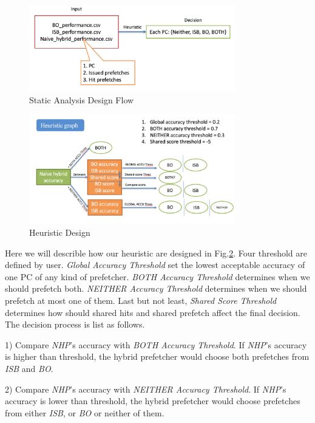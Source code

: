   \begin{figure}[ht!]
	  \centering
	  \includegraphics[width=0.8\textwidth]{images/staticanalysis_flow.png}
	  \caption{Static Analysis Design Flow}
	  \label{fig:staticanalysis_flow}
  \end{figure}


  \begin{figure}[ht!]
	  \centering
	  \includegraphics[width=0.8\textwidth]{images/heuristic_design.png}
	  \caption{Heuristic Design}
	  \label{fig:heuritic design}
  \end{figure}

  Here we will describle how our heuristic are designed in Fig.\ref{fig:heuritic design}. Four threshold are defined by user. \emph{Global Accuracy Threshold} set the lowest acceptable accuracy of one PC of any kind of prefetcher. \emph{BOTH Accuracy Threshold} determines when we should prefetch both. \emph{NEITHER Accuracy Threshold} determines when we should prefetch at most one of them. Last but not least, \emph{Shared Score Threshold} determines how should shared hits and shared prefetch affect the final decision. The decision process is list as follows.

  1) Compare \emph{NHP}'s accuracy with \emph{BOTH Accuracy Threshold}. If \emph{NHP}'s accuracy is higher than threshold, the hybrid prefetcher would choose both prefetches from \emph{ISB} and \emph{BO}.

  2) Compare \emph{NHP}'s accuracy with \emph{NEITHER Accuracy Threshold}. If \emph{NHP}'s accuracy is lower than threshold, the hybrid prefetcher would choose prefetches from either \emph{ISB}, or \emph{BO} or neither of them.

